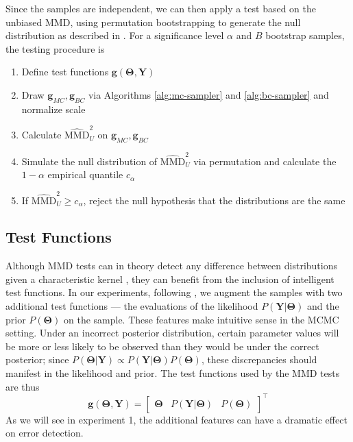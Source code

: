 \documentclass[a4paper,11pt]{article}
\begin{document}
Since the samples are independent, we can then apply a test based on the unbiased MMD, using permutation bootstrapping to generate the null distribution as described in \cite{gretton_kernel_2012}. For a significance level $\alpha$ and $B$ bootstrap samples, the testing procedure is
\begin{enumerate}
    \item Define test functions $\mathbf{g}(\mathbf{\Theta}, \mathbf{Y})$
    \item Draw $\mathbf{g}_{MC}, \mathbf{g}_{BC}$ via Algorithms \ref{alg:mc-sampler} and \ref{alg:bc-sampler} and normalize scale
    \item Calculate $\widehat{\mathrm{MMD}}_{U}^{2}$ on $\mathbf{g}_{MC}, \mathbf{g}_{BC}$
    \item Simulate the null distribution of $\widehat{\mathrm{MMD}}_{U}^{2}$ via permutation and calculate the $1-\alpha$ empirical quantile $c_{\alpha}$
    \item If $\widehat{\mathrm{MMD}}_{U}^{2} \geq c_{\alpha}$, reject the null hypothesis that the distributions are the same
\end{enumerate}

\subsection{Test Functions}
Although MMD tests can in theory detect any difference between distributions given a characteristic kernel  \cite{gretton_kernel_2012}, they can benefit from the inclusion of intelligent test functions. In our experiments, following \cite{gandy_unit_2020}, we augment the samples with two additional test functions --- the evaluations of the likelihood $P(\mathbf{Y}|\mathbf{\Theta})$ and the prior $P(\mathbf{\Theta})$ on the sample. These features make intuitive sense in the MCMC setting. Under an incorrect posterior distribution, certain parameter values will be more or less likely to be observed than they would be under the correct posterior; since $P(\mathbf{\Theta}|\mathbf{Y}) \propto P(\mathbf{Y}|\mathbf{\Theta}) P(\mathbf{\Theta})$, these discrepancies should manifest in the likelihood and prior. The test functions used by the MMD tests are thus
\begin{equation}
    \mathbf{g}(\mathbf{\Theta}, \mathbf{Y}) = \begin{bmatrix} \mathbf{\Theta} & P(\mathbf{Y}|\mathbf{\Theta}) & P(\mathbf{\Theta}) \end{bmatrix}^{\top}
    \label{eq:testfn}
\end{equation}
As we will see in experiment 1, the additional features can have a dramatic effect on error detection.
\end{document}
